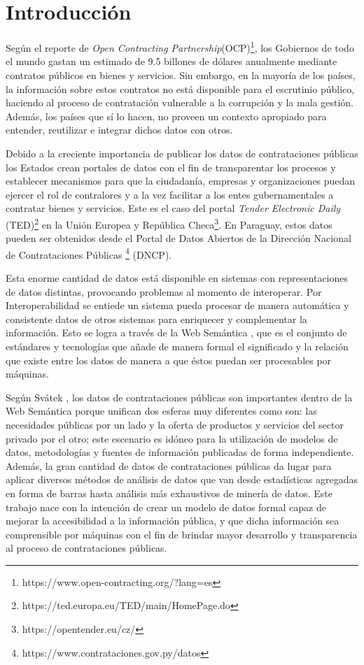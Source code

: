 \chapter{Introducción}
\label{chap:introduccion}




Según el reporte de \textit{Open Contracting Partnership}(OCP)\footnote{https://www.open-contracting.org/?lang=es}, los Gobiernos de todo el mundo gastan un estimado de 9.5 billones de dólares anualmente mediante contratos públicos en bienes y servicios. Sin embargo, en la mayoría de los países, la información sobre estos contratos no está disponible para el escrutinio público, haciendo al proceso de contratación vulnerable a la corrupción y la mala gestión. Además, los países que sí lo hacen, no proveen un contexto apropiado para entender, reutilizar e integrar dichos datos con otros.

Debido a la creciente importancia de publicar los datos de contrataciones públicas los Estados crean portales de datos con el fin de transparentar los procesos y establecer mecanismos para que la ciudadanía, empresas y organizaciones puedan ejercer el rol de contralores y a la vez facilitar a los entes gubernamentales a contratar bienes y servicios. Este es el caso del portal \textit{Tender Electronic Daily} (TED)\footnote{https://ted.europa.eu/TED/main/HomePage.do}  en la Unión Europea y República Checa\footnote{https://opentender.eu/cz/}. En Paraguay, estos datos pueden ser obtenidos desde el Portal de Datos Abiertos de la Dirección Nacional de Contrataciones Públicas \footnote{https://www.contrataciones.gov.py/datos} (DNCP).

Esta enorme cantidad de datos está disponible en sistemas con representaciones de datos distintas, provocando problemas al momento de interoperar. Por Interoperabilidad se entiede un sistema pueda procesar de manera automática y consistente datos de otros sistemas para enriquecer y complementar la información. Esto se logra a través de la Web Semántica \cite{Semantic20:online}, que es el conjunto de estándares y tecnologías que añade de manera formal el significado y la relación que existe entre los datos de manera a que éstos puedan ser procesables por máquinas.

Según Svátek \cite{svatek2014linked}, los datos de contrataciones públicas son importantes dentro de la Web Semántica \cite{Semantic20:online} porque unifican dos esferas muy diferentes como son: las necesidades públicas por un lado y la oferta de productos y servicios del sector privado por el otro; este escenario es idóneo para la utilización de modelos de datos, metodologías y fuentes de información publicadas de forma independiente. Además, la gran cantidad de datos de contrataciones públicas da lugar para aplicar diversos métodos de análisis de datos que van desde estadísticas agregadas en forma de barras hasta análisis más exhaustivos de minería de datos.
Este trabajo nace con la intención de crear un modelo de datos formal capaz de mejorar la accesibilidad a la información pública, y que dicha información sea comprensible por máquinas con el fin de brindar mayor desarrollo y transparencia al proceso de contrataciones públicas. 


